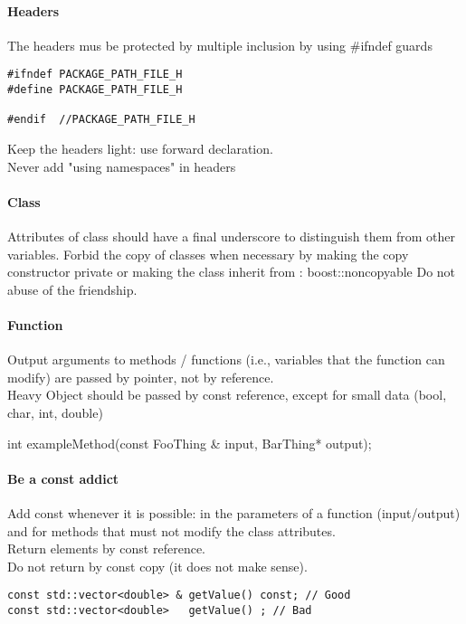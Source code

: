 \paragraph{Headers}
The headers mus be protected by multiple inclusion by using \#ifndef guards
\begin{verbatim}
#ifndef PACKAGE_PATH_FILE_H
#define PACKAGE_PATH_FILE_H

#endif  //PACKAGE_PATH_FILE_H
\end{verbatim}

Keep the headers light: use forward declaration.\\
Never add "using namespaces" in headers

\paragraph{Class}
Attributes of class should have a final underscore to distinguish them from other variables.
Forbid the copy of classes when necessary by making the copy constructor private or making the class inherit from : boost::noncopyable
Do not abuse of the friendship.

\paragraph{Function}
Output arguments to methods / functions (i.e., variables that the function can modify) are passed by pointer, not by reference.\\
Heavy Object should be passed by const reference, except for small data (bool, char, int, double)\\
\begin{tt}
int exampleMethod(const FooThing \& input, BarThing* output);
\end{tt}

\paragraph{Be a const addict} Add const whenever it is possible: in the parameters of a function (input/output) and for methods that must not modify the class attributes.\\
Return elements by const reference.\\
Do not return by const copy (it does not make sense).
\begin{verbatim}
const std::vector<double> & getValue() const; // Good
const std::vector<double>   getValue() ; // Bad
\end{verbatim}


